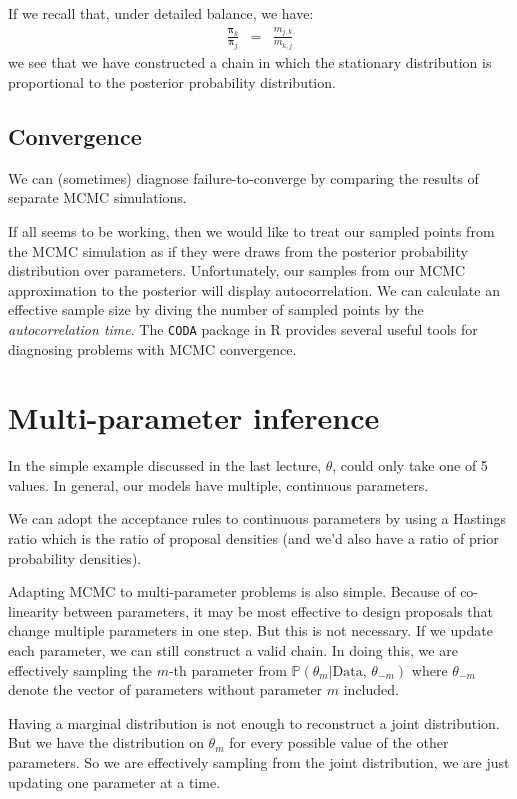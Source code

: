 \documentclass[11pt]{article}
\renewcommand{\Pr}{{\mathbb P}}
\begin{document}
If we recall that, under detailed balance, we have:
\begin{eqnarray*}
	\frac{\bm \pi_k}{\bm \pi_j} & = & \frac{m_{j,k}}{m_{k,j}}
\end{eqnarray*}
we see that we have constructed a chain in which the stationary distribution is proportional to the posterior probability distribution.

\subsection*{Convergence}
We can (sometimes) diagnose failure-to-converge by comparing the results of separate MCMC simulations.

If all seems to be working, then we would like to treat our sampled points from the MCMC simulation as if they were draws from the posterior probability distribution over parameters.
Unfortunately, our samples from our MCMC approximation to the posterior will display autocorrelation.
We can calculate an effective sample size by diving the number of sampled points by the {\em autocorrelation time}.
The {\tt CODA} package in R provides several useful tools for diagnosing problems with MCMC convergence.


\section*{Multi-parameter inference}
In the simple example discussed in the last lecture, $\theta$, could only take one of 5 values.
In general, our models have multiple, continuous parameters.

We can adopt the acceptance rules to continuous parameters by using a Hastings ratio which is the ratio of proposal densities (and we'd also have a ratio of prior probability densities).

Adapting MCMC to multi-parameter problems is also simple.
Because of co-linearity between parameters, it may be most effective to design proposals that change multiple parameters in one step. 
But this is not necessary.
If we update each parameter, we can still construct a valid chain.
In doing this, we are effectively sampling the $m$-th parameter from $\Pr(\theta_m|\mbox{Data, }\theta_{-m})$ where $\theta_{-m}$ denote the vector of parameters without parameter $m$ included.

Having a marginal distribution is not enough to reconstruct a joint distribution.  
But we have the distribution on $\theta_m$ for every possible value of the other parameters.
So we are effectively sampling from the joint distribution, we are just updating one parameter at a time.
\end{document}
